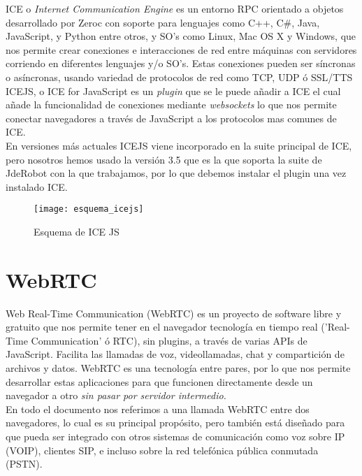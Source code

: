 ICE o \emph{Internet Communication Engine} es un entorno RPC orientado a objetos desarrollado por Zeroc con soporte para lenguajes como C++, C\#, Java, JavaScript, y Python entre otros, y SO's como Linux, Mac OS X y Windows, que nos permite crear conexiones e interacciones de red entre máquinas con servidores corriendo en diferentes lenguajes y/o SO's. Estas conexiones pueden ser síncronas o asíncronas, usando variedad de protocolos de red como TCP, UDP ó SSL/TTS\\

ICEJS, o ICE for JavaScript es un \textit{plugin} que se le puede añadir a ICE el cual añade la funcionalidad de conexiones mediante \textit{websockets} lo que nos permite conectar navegadores a través de JavaScript a los protocolos mas comunes de ICE. \\

En versiones más actuales ICEJS viene incorporado en la suite principal de ICE, pero nosotros hemos usado la versión 3.5 que es la que soporta la suite de JdeRobot con la que trabajamos, por lo que debemos instalar el plugin una vez instalado ICE.\\

\begin{figure}[htb]
\centering
\texttt{[image: esquema\_icejs]}
\caption{Esquema de ICE JS}
\label{fig:esquema_icejs}
\end{figure}

\section{WebRTC}

Web Real-Time Communication (WebRTC) es un proyecto de software libre y gratuito que nos permite tener en el navegador tecnología en tiempo real ('Real-Time Communication' ó RTC), sin plugins, a través de varias APIs de JavaScript. Facilita las llamadas de voz, videollamadas, chat y compartición de archivos y datos. WebRTC es una tecnología entre pares, por lo que nos permite desarrollar estas aplicaciones para que funcionen directamente desde un navegador a otro \emph{sin pasar por servidor intermedio.}\\

En todo el documento nos referimos a una llamada WebRTC entre dos navegadores, lo cual es su principal propósito, pero también está diseñado para que pueda ser integrado con otros sistemas de comunicación como voz sobre IP (VOIP), clientes SIP, e incluso sobre la red telefónica pública conmutada (PSTN).\\

